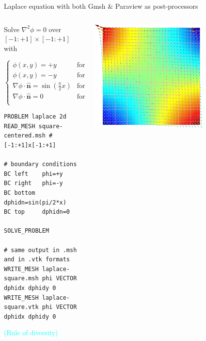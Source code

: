 \documentclass[
  ignorenonframetext,
  aspectratio=169,
]{beamer}
\begin{document}
\begin{frame}[fragile]{Laplace equation with both Gmsh \& Paraview as
post-processors}
\protect\hypertarget{laplace-equation-with-both-gmsh-paraview-as-post-processors}{}
\begin{columns}[T]
\begin{column}{0.6\textwidth}
Solve \(\nabla^2 \phi = 0\) over \([-1:+1]\times[-1:+1]\) with

\[
\begin{cases}
\phi(x,y) = +y & \text{for $x=-1$ (left)} \\
\phi(x,y) = -y & \text{for $x=+1$ (right)} \\
\nabla \phi \cdot \hat{\mathbf{n}} = \sin\left(\frac{\pi}{2} x\right) & \text{for $y=-1$ (bottom)} \\
\nabla \phi \cdot \hat{\mathbf{n}} =0 & \text{for $y=+1$ (top)} \\
\end{cases}
\]

\begin{lstlisting}[style=feenox]
PROBLEM laplace 2d
READ_MESH square-centered.msh # [-1:+1]x[-1:+1]

# boundary conditions
BC left    phi=+y
BC right   phi=-y
BC bottom  dphidn=sin(pi/2*x)
BC top     dphidn=0

SOLVE_PROBLEM

# same output in .msh and in .vtk formats
WRITE_MESH laplace-square.msh phi VECTOR dphidx dphidy 0
WRITE_MESH laplace-square.vtk phi VECTOR dphidx dphidy 0
\end{lstlisting}

\vspace{-0.25cm}\hfill{\footnotesize\textcolor{cyan}{(Rule of {diversity})}}
\end{column}

\pause

\begin{column}{0.4\textwidth}
\centering \hspace{0.5cm}\includegraphics[width=0.7\textwidth,height=\textheight]{laplace-square-gmsh.png}\\


\end{column}
\end{columns}
\end{frame}
\end{document}
